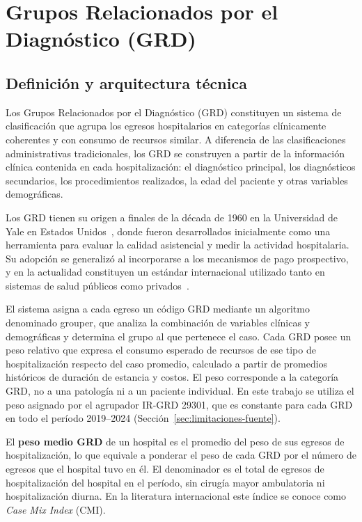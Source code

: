 \section{Grupos Relacionados por el Diagnóstico (GRD)}
\label{sec:grd}

\subsection{Definición y arquitectura técnica}
\label{sec:grd-definicion}

Los Grupos Relacionados por el Diagnóstico (GRD) constituyen un sistema de
clasificación que agrupa los egresos hospitalarios en categorías clínicamente
coherentes y con consumo de recursos similar. A diferencia de las clasificaciones
administrativas tradicionales, los GRD se construyen a partir de la información
clínica contenida en cada hospitalización: el diagnóstico principal, los
diagnósticos secundarios, los procedimientos realizados, la edad del paciente y
otras variables demográficas.

Los GRD tienen su origen a finales de la década de 1960 en la Universidad de
Yale en Estados Unidos~\citep{Fetter1980}, donde fueron desarrollados inicialmente como una
herramienta para evaluar la calidad asistencial y medir la actividad
hospitalaria. Su adopción se generalizó al incorporarse a los mecanismos de pago
prospectivo, y en la actualidad constituyen un estándar internacional utilizado
tanto en sistemas de salud públicos como privados~\citep{Cid2024}.

El sistema asigna a cada egreso un código GRD mediante un algoritmo denominado
grouper, que analiza la combinación de variables clínicas y
demográficas y determina el grupo al que pertenece el caso. Cada GRD posee un
peso relativo que expresa el consumo esperado de recursos de ese tipo de
hospitalización respecto del caso promedio, calculado a partir de promedios
históricos de duración de estancia y costos. El peso corresponde a la categoría
GRD, no a una patología ni a un paciente individual. En este trabajo se utiliza
el peso asignado por el agrupador IR-GRD 29301, que es constante para cada GRD
en todo el período 2019--2024 (Sección~\ref{sec:limitaciones-fuente}).

El \textbf{peso medio GRD} de un hospital es el promedio del peso de sus
egresos de hospitalización, lo que equivale a ponderar el peso de cada GRD por
el número de egresos que el hospital tuvo en él. El denominador es el total de
egresos de hospitalización del hospital en el período, sin cirugía mayor
ambulatoria ni hospitalización diurna. En la literatura internacional este
índice se conoce como \textit{Case Mix Index} (CMI).

